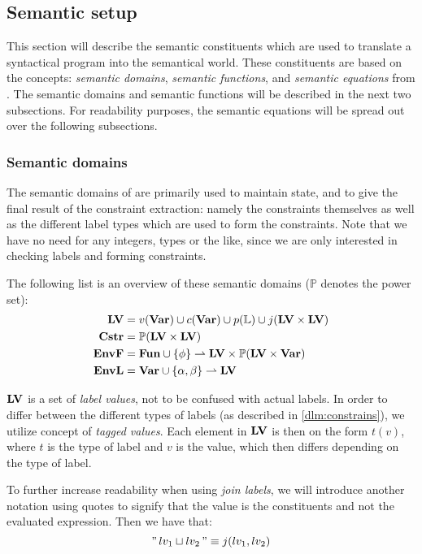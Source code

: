 \subsection{Semantic setup}
This section will describe the semantic constituents which are used to translate a syntactical \thelang{} program into the semantical world.
These constituents are based on the concepts: \emph{semantic domains}, \emph{semantic functions}, and \emph{semantic equations} from \cite[Chapter 9]{slonneger1995formal}.
The semantic domains and semantic functions will be described in the next two subsections.
For readability purposes, the semantic equations will be spread out over the following subsections.

\subsubsection{Semantic domains}
The semantic domains of \thelang{} are primarily used to maintain state, and to give the final result of the constraint extraction: namely the constraints themselves as well as the different label types which are used to form the constraints.
Note that we have no need for any integers, types or the like, since we are only interested in checking labels and forming constraints.

The following list is an overview of these semantic domains ($\mathbb P$ denotes the power set):
\begin{align*}
\mathbf{LV}    & = v(\mathbf{Var}) \cup c(\mathbf{Var}) \cup p(\mathbb{L}) \cup j(\mathbf{LV} \times \mathbf{LV}) \\
\mathbf{Cstr}  & = \mathbb P (\mathbf{LV} \times \mathbf{LV}) \\
\mathbf{EnvF}  & = \mathbf{Fun} \cup \{ \phi \} \rightharpoonup \mathbf{LV} \times \mathbb P (\mathbf{LV} \times \mathbf{Var}) \\
\mathbf{EnvL}  & = \mathbf{Var} \cup \{ \alpha, \beta \} \rightharpoonup \mathbf{LV}
\end{align*}

$\mathbf{LV}$ is a set of \emph{label values}, not to be confused with actual labels.
In order to differ between the different types of labels (as described in \cref{dlm:constrains}), we utilize concept of \emph{tagged values}.
Each element in $\mathbf{LV}$ is then on the form $t(v)$, where $t$ is the type of label and $v$ is the value, which then differs depending on the type of label.

To further increase readability when using \emph{join labels}, we will introduce another notation using quotes to signify that the value is the constituents and not the evaluated expression.
Then we have that:
\[ "\,lv_1 \sqcup lv_2\," \equiv j(lv_1, lv_2) \]

